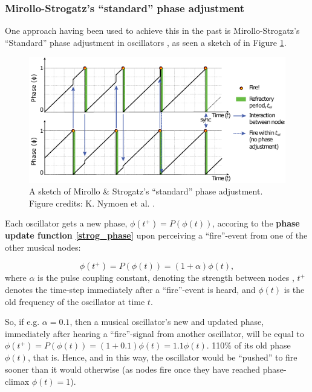 		\subsubsection{Mirollo-Strogatz's ``standard'' phase adjustment} %
		\label{mirollo_strogatz_phase_adjust}
		
		
		One approach having been used to achieve this in the past is Mirollo-Strogatz's ``Standard'' phase adjustment in oscillators \cite{mirollo_strogatz_PCO_synch}, as seen a sketch of in Figure \ref{fig:mirollo_strogatz_phase_adj_sketch}.
		
		\begin{figure}[ht!]
			\centering
			\includegraphics[width=\linewidth]{Assets/DocSegments/Chapters/Background/Figures/Illustrations/MirolloStrogatzPhaseSync.pdf}
			\caption[Sketch of Mirollo \& Strogatz's ``standard'' phase adjustment.]{A sketch of Mirollo \& Strogatz's ``standard'' phase adjustment. Figure credits: K. Nymoen et al. \cite{nymoen_synch}.}
			\label{fig:mirollo_strogatz_phase_adj_sketch}
		\end{figure}
		
		Each oscillator gets a new phase, $\phi(t^+) = P(\phi(t))$, accoring to the \textbf{phase update function \eqref{strog_phase}} upon perceiving a ``fire''-event from one of the other musical nodes:
		
		\begin{equation}
		\label{strog_phase}
			\phi(t^+) = P(\phi(t)) = (1 + \alpha)\phi(t) ,
		\end{equation} \nl
		where $\alpha$ is the pulse coupling constant, denoting the strength between nodes \cite{nymoen_synch}, $t^+$ denotes the time-step immediately after a ``fire''-event is heard, and $\phi(t)$ is the old frequency of the oscillator at time $t$. 
		
		So, if e.g. $\alpha = 0.1$, then a musical oscillator's new and updated phase, immediately after hearing a ``fire''-signal from another oscillator, will be equal to $\phi(t^+) = P(\phi(t)) = (1 + 0.1)\phi(t) = 1.1\phi(t)$. 110\% of its old phase $\phi(t)$, that is. Hence, and in this way, the oscillator would be ``pushed'' to fire sooner than it would otherwise (as nodes fire once they have reached phase-climax $\phi(t)=1$).
	
